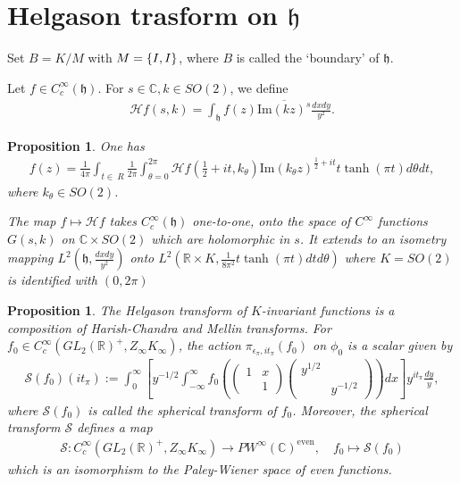 \documentclass[11pt,reqno]{amsart}
\newcommand{\bna}{\begin{eqnarray*}}
\newcommand{\ena}{\end{eqnarray*}}
\newcommand{\bma}{\begin{pmatrix}}
\newcommand{\ema}{\end{pmatrix}}
\newcommand{\mk}{\mathfrak}
\def\im{{\mathrm{Im}}}
\def\C{\mathbb{C}}
\def\R{\mathbb{R}}
\newtheorem{prop}[lemma]{Proposition}
\theoremstyle{definition}
\begin{document}
\section{Helgason trasform on $\mk h$}
Set $B=K/M$ with $M=\{\-I,I\}$, where $B$ is called the `boundary' of $\mk h$.


Let $f\in C_c^\infty(\mk h)$.
For $s\in\C, k\in SO(2)$, we define
\bna
\mathcal H f(s,k)=\int_{\mk h} f(z)\overline{\im (kz)^s} \frac{dxdy}{y^2}.
\ena
\begin{prop}
One has
\bna
f(z)=\frac{1}{4\pi}\int_{t\in\ R} \frac{1}{2\pi}\int_{\theta=0}^{2\pi}
\mathcal Hf(\frac{1}{2}+it,k_\theta) \im(k_\theta z)^{\frac{1}{2}+it}
t\tanh(\pi t) d\theta dt,
\ena
where $k_\theta\in SO(2)$.

The map $f\mapsto\mathcal Hf$ takes $C_c^\infty(\mk h)$
one-to-one, onto the space of $C^\infty$ functions  $G(s,k)$
on $\C\times SO(2)$ which are holomorphic in $s$.
It extends to an isometry mapping $L^2(\mk h,\frac{dxdy}{y^2})$
onto $L^2(\R\times K,\frac{1}{8\pi^2}t\tanh(\pi t)dtd\theta)$
where $K=SO(2)$ is identified with $(0,2\pi)$
\end{prop}
\begin{prop}
The Helgason transform of $K$-invariant functions is a composition of Harish-Chandra
and Mellin transforms.
For $f_0\in C_c^\infty(GL_2(\R)^+,Z_\infty K_\infty)$,
the action $\pi_{\epsilon_\pi,it_{\pi}}(f_0)$ on  $\phi_0$ is a scalar given by
\bna
\mathcal S(f_0)(it_\pi):=\int_{0}^\infty
\left[y^{-1/2}
\int_{-\infty}^\infty f_0\left(\bma 1&x\\&1\ema\bma y^{1/2}&\\&y^{-1/2}\ema\right)
dx\right] y^{it_{\pi}}\frac{dy}{y},
\ena
where $\mathcal S(f_0)$ is called the spherical transform of $f_0$. Moreover,
the spherical transform $\mathcal S$ defines a map
\bna
\mathcal S: C_c^\infty(GL_2(\R)^+,Z_\infty K_\infty)\rightarrow PW^\infty(\C)^{\mathrm{even}},\quad f_0\mapsto \mathcal S(f_0)
\ena
which is an isomorphism to the Paley-Wiener space of even functions.
\end{prop}
\end{document}
